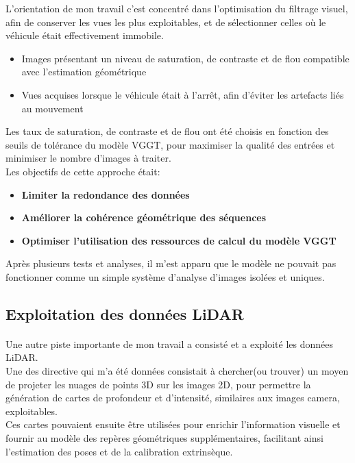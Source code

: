 \documentclass[12pt,a4paper,oneside]{report}
\newcommand{\textsb}[1]{{\fontseries{sb}\selectfont #1}}
\begin{document}
\hspace*{.5cm} L'orientation de mon travail c'est concentré dans l'optimisation du filtrage visuel, afin de conserver les vues les plus exploitables, et de sélectionner celles où le véhicule était effectivement immobile. 
\begin{itemize}[label=\textsb{\textendash}]
	\item \textsb{Images présentant un niveau de saturation, de contraste et de flou compatible avec l'estimation géométrique}
	\item \textsb{Vues acquises lorsque le véhicule était à l'arrêt, afin d'éviter les artefacts liés au mouvement}
\end{itemize}
\hspace*{.5cm} Les taux de saturation, de contraste et de flou ont été choisis en fonction des seuils de tolérance du modèle VGGT, pour maximiser la qualité des entrées et minimiser le nombre d'images à traiter.\\
\hspace*{.5cm} Les objectifs de cette approche était:
\begin{itemize}[label=\textbullet]
    \item \textbf{Limiter la redondance des données}
    \item \textbf{Améliorer la cohérence géométrique des séquences}
    \item \textbf{Optimiser l'utilisation des ressources de calcul du modèle VGGT}
\end{itemize}

\bigskip

\hspace*{.5cm} Après plusieurs tests et analyses, il m'est apparu que le modèle ne pouvait pas fonctionner comme un simple système d'analyse d'images isolées et uniques.\\

\subsection{Exploitation des données LiDAR}

\paragraph{} \hspace*{.8cm} Une autre piste importante de mon travail a consisté et a exploité les données LiDAR. \\
\hspace*{1cm} Une des directive qui m'a été données consistait à chercher(ou trouver) un moyen de projeter les nuages de points 3D sur les images 2D, pour permettre la génération de cartes de profondeur et d'intensité, similaires aux images camera, exploitables.\\
\hspace*{.5cm} Ces cartes pouvaient ensuite être utilisées pour enrichir l'information visuelle et fournir au modèle des repères géométriques supplémentaires, facilitant ainsi l'estimation des poses et de la calibration extrinsèque.\\
\end{document}
